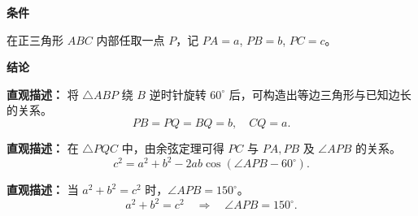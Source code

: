 \begin{statementbox}
	\textbf{\textcolor{CStatement}{条件}}
	\begin{description}[style=nextline, leftmargin=2.8em, labelsep=0.5em, itemsep=0.35em]
		\item[\textbf{\textcolor{CStatement}{条件 1（正三角形内点）：}}]
			在正三角形 $ABC$ 内部任取一点 $P$，记 $PA=a$, $PB=b$, $PC=c$。
	\end{description}

	\medskip
	\textbf{\textcolor{CStatement}{结论}}
	\begin{description}[style=nextline, leftmargin=2.8em, labelsep=0.5em, itemsep=0.45em]
		\item[\textbf{\textcolor{CStatement}{结论一（旋转构造关系）：}}]
			\textbf{\textcolor{CStatement}{直观描述：}}
			将 $\triangle ABP$ 绕 $B$ 逆时针旋转 $60^\circ$ 后，可构造出等边三角形与已知边长的关系。
			\[
				PB = PQ = BQ = b,\quad CQ = a.
			\]
		\item[\textbf{\textcolor{CStatement}{结论二（余弦定理公式）：}}]
			\textbf{\textcolor{CStatement}{直观描述：}}
			在 $\triangle PQC$ 中，由余弦定理可得 $PC$ 与 $PA, PB$ 及 $\angle APB$ 的关系。
			\[
				c^2 = a^2 + b^2 - 2ab\cos(\angle APB - 60^\circ).
			\]
		\item[\textbf{\textcolor{CStatement}{推广结论（勾股特例）：}}]
			\textbf{\textcolor{CStatement}{直观描述：}}
			当 $a^2+b^2=c^2$ 时，$\angle APB = 150^\circ$。
			\[
				a^2+b^2=c^2 \quad\Rightarrow\quad \angle APB = 150^\circ.
			\]
	\end{description}

\end{statementbox}

